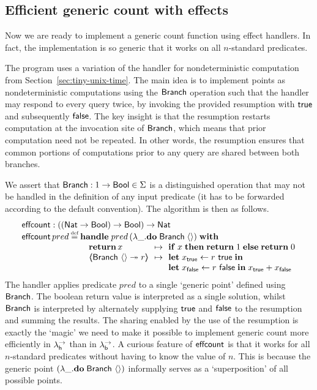 \documentclass[12pt,phd,lfcs,twoside,openright,logo,leftchapter,normalheadings]{infthesis}
\theoremstyle{plain}
\theoremstyle{definition}
\begin{document}
\subsection{Efficient generic count with effects}
\label{sec:effectful-counting}

Now we are ready to implement a generic count function using effect
handlers. In fact, the implementation is so generic that it works on
all $n$-standard predicates.

The program uses a variation of the handler for nondeterministic
computation from Section~\ref{sec:tiny-unix-time}.  The main idea is
to implement points as nondeterministic computations using the
$\mathsf{Branch}$ operation such that the handler may respond to every query
twice, by invoking the provided resumption with $\mathsf{true}$ and
subsequently $\mathsf{false}$.  The key insight is that the resumption
restarts computation at the invocation site of $\mathsf{Branch}$, which means
that prior computation need not be repeated.  In other words, the
resumption ensures that common portions of computations prior to any
query are shared between both branches.

We assert that $\mathsf{Branch} : 1 \to \mathsf{Bool} \in \Sigma$ is a
distinguished operation that may not be handled in the definition of
any input predicate (it has to be forwarded according to the default
convention).
%
The algorithm is then as follows.
%
{
\[
  \bl
    \ECount : ((\Nat \to \Bool) \to \Bool) \to \Nat\\
    \ECount\,pred \defas
      \bl
      \Handle\; pred\,(\lambda\_. \Do\; \Branch\; \Unit)\; \With\\
      \quad\ba[t]{@{}l@{\hspace{1.5ex}}c@{\hspace{1.5ex}}l@{}}
           \Return\, x         &\mapsto& \If\; x\; \Then\;\Return\; 1 \;\Else\;\Return\; 0 \\
           \OpCase{\Branch}{\Unit}{r} &\mapsto&
              \ba[t]{@{}l}
                \Let\;x_\True \revto  r~\True\; \In\\
                \Let\;x_\False \revto r~\False\;\In\;
                x_\True + x_\False \\
              \ea
           \ea \\
      \el
  \el
\]}%
%
The handler applies predicate $pred$ to a single `generic point'
defined using $\mathsf{Branch}$. The boolean return value is interpreted as a
single solution, whilst $\mathsf{Branch}$ is interpreted by alternately
supplying $\mathsf{true}$ and $\mathsf{false}$ to the resumption and summing the
results.  The sharing enabled by the use of the resumption is exactly
the `magic' we need to make it possible to implement generic count
more efficiently in $\lambda^\rightarrow_{\mathsf{h}}$ than in $\lambda^\rightarrow_{\mathsf{b}}$.
%
A curious feature of $\mathsf{effcount}$ is that it works for all $n$-standard
predicates without having to know the value of $n$. This is because
the generic point $(\lambda\_.\mathbf{do}\;\mathsf{Branch}~\langle  \rangle)$ informally serves as a
`superposition' of all possible points.
\end{document}
